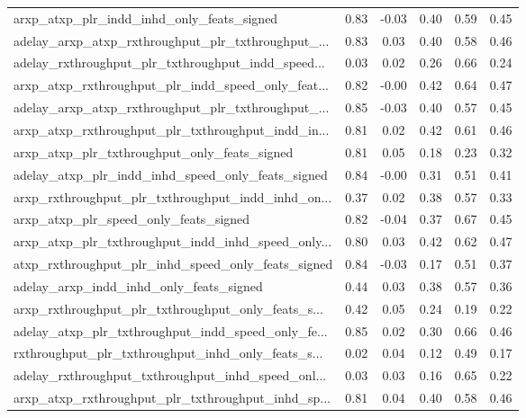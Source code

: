 \begin{tabular}{|l|*{4}{c}|r|}
arxp\_atxp\_plr\_indd\_inhd\_only\_feats\_signed          & 0.83 & -0.03 &    0.40 &       0.59 &  0.45 \\
adelay\_arxp\_atxp\_rxthroughput\_plr\_txthroughput\_... & 0.83 &  0.03 &    0.40 &       0.58 &  0.46 \\
adelay\_rxthroughput\_plr\_txthroughput\_indd\_speed... & 0.03 &  0.02 &    0.26 &       0.66 &  0.24 \\
arxp\_atxp\_rxthroughput\_plr\_indd\_speed\_only\_feat... & 0.82 & -0.00 &    0.42 &       0.64 &  0.47 \\
adelay\_arxp\_atxp\_rxthroughput\_plr\_txthroughput\_... & 0.85 & -0.03 &    0.40 &       0.57 &  0.45 \\
arxp\_atxp\_rxthroughput\_plr\_txthroughput\_indd\_in... & 0.81 &  0.02 &    0.42 &       0.61 &  0.46 \\
arxp\_atxp\_plr\_txthroughput\_only\_feats\_signed       & 0.81 &  0.05 &    0.18 &       0.23 &  0.32 \\
adelay\_atxp\_plr\_indd\_inhd\_speed\_only\_feats\_signed  & 0.84 & -0.00 &    0.31 &       0.51 &  0.41 \\
arxp\_rxthroughput\_plr\_txthroughput\_indd\_inhd\_on... & 0.37 &  0.02 &    0.38 &       0.57 &  0.33 \\
arxp\_atxp\_plr\_speed\_only\_feats\_signed              & 0.82 & -0.04 &    0.37 &       0.67 &  0.45 \\
arxp\_atxp\_plr\_txthroughput\_indd\_inhd\_speed\_only... & 0.80 &  0.03 &    0.42 &       0.62 &  0.47 \\
atxp\_rxthroughput\_plr\_inhd\_speed\_only\_feats\_signed & 0.84 & -0.03 &    0.17 &       0.51 &  0.37 \\
adelay\_arxp\_indd\_inhd\_only\_feats\_signed            & 0.44 &  0.03 &    0.38 &       0.57 &  0.36 \\
arxp\_rxthroughput\_plr\_txthroughput\_only\_feats\_s... & 0.42 &  0.05 &    0.24 &       0.19 &  0.22 \\
adelay\_atxp\_plr\_txthroughput\_indd\_speed\_only\_fe... & 0.85 &  0.02 &    0.30 &       0.66 &  0.46 \\
rxthroughput\_plr\_txthroughput\_inhd\_only\_feats\_s... & 0.02 &  0.04 &    0.12 &       0.49 &  0.17 \\
adelay\_rxthroughput\_txthroughput\_inhd\_speed\_onl... & 0.03 &  0.03 &    0.16 &       0.65 &  0.22 \\
arxp\_atxp\_rxthroughput\_plr\_txthroughput\_inhd\_sp... & 0.81 &  0.04 &    0.40 &       0.58 &  0.46 \\

\end{tabular}
